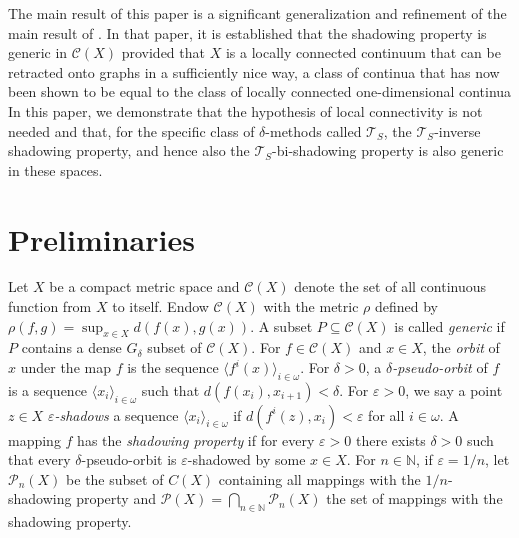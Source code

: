 \documentclass{amsart}
\numberwithin{equation}{section}
\begin{document}
The main result of this paper is a significant generalization and refinement of the main result of \cite{genericshadowingmeddaugh}. In that paper, it is established that the shadowing property is generic in $\mathcal C(X)$ provided that $X$ is a locally connected continuum that can be retracted onto graphs in a sufficiently nice way, a class of continua that has now been shown to be equal to the class of locally connected one-dimensional continua \cite{peanovejnar} In this paper, we demonstrate that the hypothesis of local connectivity is not needed and that, for the specific class of $\delta$-methods called $\mathcal T_S$, the $\mathcal T_S$-inverse shadowing property, and hence also the $\mathcal T_S$-bi-shadowing property is also generic in these spaces.




\section{Preliminaries}


Let $X$ be a compact metric space and $\mathcal C(X)$ denote the set of all continuous function from $X$ to itself. Endow $\mathcal C(X)$ with the metric $\rho$ defined by $\rho(f,g)=\sup_{x\in X}d(f(x),g(x))$. A subset $P\subseteq \mathcal C(X)$ is called \emph{generic} if $P$ contains a dense $G_\delta$ subset of $\mathcal C(X)$. For $f\in \mathcal C(X)$ and $x\in X$, the \emph{orbit} of $x$ under the map $f$ is the sequence $\langle f^i(x)\rangle_{i\in \omega}.$ For $\delta>0$, a \emph{$\delta$-pseudo-orbit} of $f$ is a sequence $\langle x_i \rangle_{i\in \omega}$ such that $d(f(x_i),x_{i+1})<\delta.$ For $\varepsilon>0$, we say a point $z\in X$ \emph{$\varepsilon$-shadows} a sequence $\langle x_i \rangle_{i\in \omega}$ if $d(f^i(z),x_i)<\varepsilon$ for all $i\in\omega$.  
A mapping $f$ has the \emph{shadowing property} if for every $\varepsilon>0$ there exists $\delta>0$ such that every $\delta$-pseudo-orbit is $\varepsilon$-shadowed by some $x\in X$. For $n\in \mathbb N$, if $\varepsilon = 1/n$, let $\mathcal{P}_n(X)$ be the subset of $C(X)$ containing all mappings with the $1/n$-shadowing property and $\mathcal{P}(X)=\bigcap_{n\in \mathbb N}\mathcal{P}_n(X) $  the set of mappings with the shadowing property. 
\end{document}
